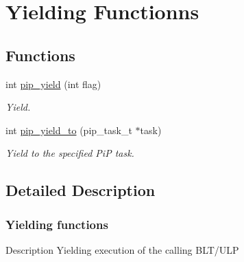 \hypertarget{group__ULP-0-yield}{\section{Yielding Functionns}
\label{group__ULP-0-yield}
}
\subsection*{Functions}
\begin{DoxyCompactItemize}
\item 
int \hyperlink{group__ULP-0-yield_ga50469f21446ce86ea18ddd282cf15894}{pip\-\_\-yield} (int flag)
\begin{DoxyCompactList}\small\item\em Yield. \end{DoxyCompactList}\item 
int \hyperlink{group__ULP-0-yield_gac30cf124b28a8d80dac34c5e1bdb66ba}{pip\-\_\-yield\-\_\-to} (pip\-\_\-task\-\_\-t $\ast$task)
\begin{DoxyCompactList}\small\item\em Yield to the specified Pi\-P task. \end{DoxyCompactList}\end{DoxyCompactItemize}


\subsection{Detailed Description}
\hypertarget{pip-yield}{}\subsubsection{Yielding functions}\label{pip-yield}
\begin{DoxyParagraph}{Description}
Yielding execution of the calling B\-L\-T/\-U\-L\-P 
\end{DoxyParagraph}


